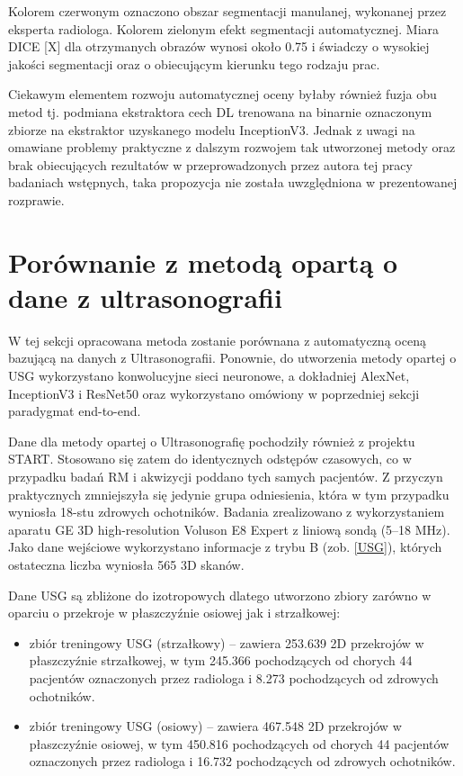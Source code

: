 Kolorem czerwonym oznaczono obszar segmentacji manulanej, wykonanej przez eksperta radiologa. Kolorem zielonym efekt segmentacji automatycznej. Miara DICE [X] dla otrzymanych obrazów wynosi około 0.75 i świadczy o wysokiej jakości segmentacji oraz o obiecującym kierunku tego rodzaju prac.

Ciekawym elementem rozwoju automatycznej oceny byłaby również fuzja obu metod tj. podmiana ekstraktora cech DL trenowana na binarnie oznaczonym zbiorze na ekstraktor uzyskanego modelu InceptionV3. Jednak z uwagi na omawiane problemy praktyczne z dalszym rozwojem tak utworzonej metody oraz brak obiecujących rezultatów w przeprowadzonych przez autora tej pracy badaniach wstępnych, taka propozycja nie została uwzględniona w prezentowanej rozprawie. 

\section{Porównanie z metodą opartą o dane z ultrasonografii}

W tej sekcji opracowana metoda zostanie porównana z automatyczną oceną bazującą na danych z Ultrasonografii. Ponownie, do utworzenia metody opartej o USG wykorzystano konwolucyjne sieci neuronowe, a dokładniej AlexNet, InceptionV3 i ResNet50 oraz wykorzystano omówiony w poprzedniej sekcji paradygmat end-to-end. 

Dane dla metody opartej o Ultrasonografię pochodziły również z projektu START. Stosowano się zatem do identycznych odstępów czasowych, co w przypadku badań RM i akwizycji poddano tych samych pacjentów. Z przyczyn praktycznych zmniejszyła się jedynie grupa odniesienia, która w tym przypadku wyniosła 18-stu zdrowych ochotników. Badania zrealizowano z wykorzystaniem aparatu GE 3D high-resolution Voluson E8 Expert z liniową sondą (5--18 MHz). Jako dane wejściowe wykorzystano informacje z trybu B (zob. \ref{USG}), których ostateczna liczba wyniosła 565 3D skanów. 

Dane USG są zbliżone do izotropowych dlatego utworzono zbiory zarówno w oparciu o przekroje w płaszczyźnie osiowej jak i strzałkowej:
\begin{itemize}
	\item zbiór treningowy USG (strzałkowy) -- zawiera 253.639 2D przekrojów w płaszczyźnie strzałkowej, w tym 245.366 pochodzących od chorych 44 pacjentów oznaczonych przez radiologa i 8.273 pochodzących od zdrowych ochotników.
	\item zbiór treningowy USG (osiowy) -- zawiera 467.548 2D przekrojów w płaszczyźnie osiowej, w tym 450.816 pochodzących od chorych 44 pacjentów oznaczonych przez radiologa i 16.732 pochodzących od zdrowych ochotników. 
\end{itemize}

